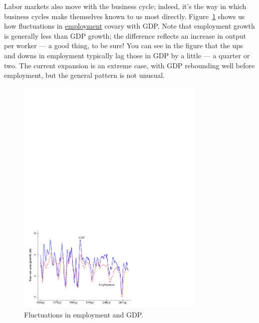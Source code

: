 Labor markets also move with the business cycle;
indeed, it's the way in which business cycles make themselves
known to us most directly.
Figure~\ref{fig:labor} shows us how fluctuations in
\href{http://research.stlouisfed.org/fred2/series/PAYEMS}{employment}
covary with GDP.
Note that employment growth is generally less than GDP growth;
the difference reflects an increase in output per worker --- a good thing, to be sure!
You can see in the figure that the ups and downs in employment
typically lag those in GDP by a little --- a quarter or two.
The current expansion is an extreme case, with
GDP rebounding well before employment,
but the general pattern is not unusual.

\begin{figure}[h!]
\caption{Fluctuations in employment and GDP.}
    \label{fig:labor}%
    \centering
    \includegraphics[width=0.8\textwidth]{Figures/us_emp_gdp.pdf}
\end{figure}

